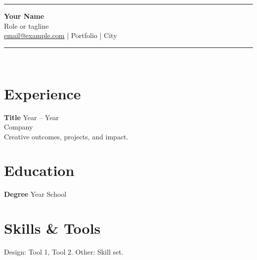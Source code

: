 \documentclass[11pt,a4paper]{article}
\begin{document}
\begin{center}\rule{2.2cm}{2.8cm}\end{center}
\begin{center}
{\LARGE \textbf{Your Name}}\\[0.15em]
{\color{gray} Role or tagline}\\[0.4em]
\href{mailto:email@example.com}{email@example.com} \quad | \quad Portfolio \quad | \quad City
\end{center}

\vspace{0.5em}
\noindent\rule{\textwidth}{1pt}\\[0.3em]

\section*{Experience}
\textbf{Title} \hfill Year -- Year \\
Company \\
Creative outcomes, projects, and impact.

\section*{Education}
\textbf{Degree} \hfill Year \quad School

\section*{Skills \& Tools}
Design: Tool 1, Tool 2. \quad Other: Skill set.
\end{document}
